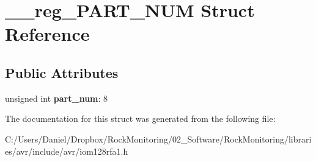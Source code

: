 \hypertarget{struct____reg___p_a_r_t___n_u_m}{}\section{\+\_\+\+\_\+reg\+\_\+\+P\+A\+R\+T\+\_\+\+N\+UM Struct Reference}
\label{struct____reg___p_a_r_t___n_u_m}
\subsection*{Public Attributes}
\begin{DoxyCompactItemize}
\item 
unsigned int {\bfseries part\+\_\+num}\+: 8\hypertarget{struct____reg___p_a_r_t___n_u_m_a2924dd6dc4f5a82ecdf33f617f84f2c2}{}\label{struct____reg___p_a_r_t___n_u_m_a2924dd6dc4f5a82ecdf33f617f84f2c2}

\end{DoxyCompactItemize}


The documentation for this struct was generated from the following file\+:\begin{DoxyCompactItemize}
\item 
C\+:/\+Users/\+Daniel/\+Dropbox/\+Rock\+Monitoring/02\+\_\+\+Software/\+Rock\+Monitoring/libraries/avr/include/avr/iom128rfa1.\+h\end{DoxyCompactItemize}
